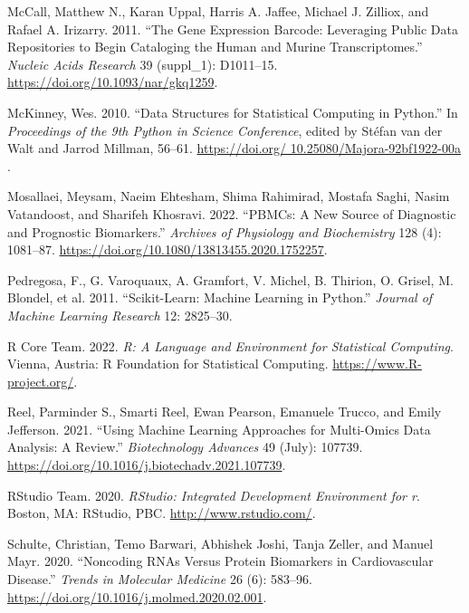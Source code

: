 \documentclass[
]{article}
\newlength{\cslhangindent}
\newlength{\cslentryspacingunit} %
\newenvironment{CSLReferences}[2] %
 {%
  \setlength{\parindent}{0pt}
  \ifodd #1
  \let\oldpar\par
  \def\par{\hangindent=\cslhangindent\oldpar}
  \fi
  \setlength{\parskip}{#2\cslentryspacingunit}
 }%
 {}
\begin{document}
\begin{CSLReferences}{1}{0}
\leavevmode{}%
McCall, Matthew N., Karan Uppal, Harris A. Jaffee, Michael J. Zilliox,
and Rafael A. Irizarry. 2011. {``The {Gene} {Expression} {Barcode}:
Leveraging Public Data Repositories to Begin Cataloging the Human and
Murine Transcriptomes.''} \emph{Nucleic Acids Research} 39 (suppl\_1):
D1011--15. \url{https://doi.org/10.1093/nar/gkq1259}.

\leavevmode{}%
McKinney, Wes. 2010. {``{D}ata {S}tructures for {S}tatistical
{C}omputing in {P}ython.''} In \emph{{P}roceedings of the 9th {P}ython
in {S}cience {C}onference}, edited by Stéfan van der Walt and Jarrod
Millman, 56--61.
\href{https://doi.org/\%2010.25080/Majora-92bf1922-00a\%20}{https://doi.org/
10.25080/Majora-92bf1922-00a }.

\leavevmode{}%
Mosallaei, Meysam, Naeim Ehtesham, Shima Rahimirad, Mostafa Saghi, Nasim
Vatandoost, and Sharifeh Khosravi. 2022. {``{PBMCs}: A New Source of
Diagnostic and Prognostic Biomarkers.''} \emph{Archives of Physiology
and Biochemistry} 128 (4): 1081--87.
\url{https://doi.org/10.1080/13813455.2020.1752257}.

\leavevmode{}%
Pedregosa, F., G. Varoquaux, A. Gramfort, V. Michel, B. Thirion, O.
Grisel, M. Blondel, et al. 2011. {``Scikit-Learn: Machine Learning in
{P}ython.''} \emph{Journal of Machine Learning Research} 12: 2825--30.

\leavevmode{}%
R Core Team. 2022. \emph{R: A Language and Environment for Statistical
Computing}. Vienna, Austria: R Foundation for Statistical Computing.
\url{https://www.R-project.org/}.

\leavevmode{}%
Reel, Parminder S., Smarti Reel, Ewan Pearson, Emanuele Trucco, and
Emily Jefferson. 2021. {``Using Machine Learning Approaches for
Multi-Omics Data Analysis: {A} Review.''} \emph{Biotechnology Advances}
49 (July): 107739.
\url{https://doi.org/10.1016/j.biotechadv.2021.107739}.

\leavevmode{}%
RStudio Team. 2020. \emph{RStudio: Integrated Development Environment
for r}. Boston, MA: RStudio, PBC. \url{http://www.rstudio.com/}.

\leavevmode{}%
Schulte, Christian, Temo Barwari, Abhishek Joshi, Tanja Zeller, and
Manuel Mayr. 2020. {``Noncoding {RNAs} Versus {Protein} {Biomarkers} in
{Cardiovascular} {Disease}.''} \emph{Trends in Molecular Medicine} 26
(6): 583--96. \url{https://doi.org/10.1016/j.molmed.2020.02.001}.


\end{CSLReferences}
\end{document}
